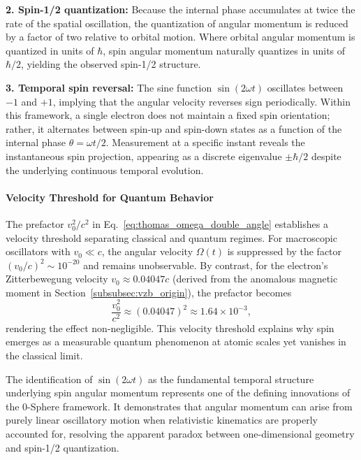 \documentclass[12pt,letterpaper]{article}
\begin{document}
\textbf{2. Spin-1/2 quantization:} Because the internal phase accumulates at twice the rate of the spatial oscillation, the quantization of angular momentum is reduced by a factor of two relative to orbital motion. Where orbital angular momentum is quantized in units of $\hbar$, spin angular momentum naturally quantizes in units of $\hbar/2$, yielding the observed spin-1/2 structure.

\textbf{3. Temporal spin reversal:} The sine function $\sin(2\omega t)$ oscillates between $-1$ and $+1$, implying that the angular velocity reverses sign periodically. Within this framework, a single electron does not maintain a fixed spin orientation; rather, it alternates between spin-up and spin-down states as a function of the internal phase $\theta = \omega t / 2$. Measurement at a specific instant reveals the instantaneous spin projection, appearing as a discrete eigenvalue $\pm \hbar/2$ despite the underlying continuous temporal evolution.

\paragraph{Velocity Threshold for Quantum Behavior}

The prefactor $v_0^2/c^2$ in Eq.~\eqref{eq:thomas_omega_double_angle} establishes a velocity threshold separating classical and quantum regimes. For macroscopic oscillators with $v_0 \ll c$, the angular velocity $\Omega(t)$ is suppressed by the factor $(v_0/c)^2 \sim 10^{-20}$ and remains unobservable. By contrast, for the electron's Zitterbewegung velocity $v_0 \approx 0.04047c$ (derived from the anomalous magnetic moment in Section~\ref{subsubsec:vzb_origin}), the prefactor becomes
\begin{equation}
\frac{v_0^2}{c^2} \approx (0.04047)^2 \approx 1.64 \times 10^{-3},
\end{equation}
rendering the effect non-negligible. This velocity threshold explains why spin emerges as a measurable quantum phenomenon at atomic scales yet vanishes in the classical limit.

The identification of $\sin(2\omega t)$ as the fundamental temporal structure underlying spin angular momentum represents one of the defining innovations of the 0-Sphere framework. It demonstrates that angular momentum can arise from purely linear oscillatory motion when relativistic kinematics are properly accounted for, resolving the apparent paradox between one-dimensional geometry and spin-1/2 quantization.
\end{document}
